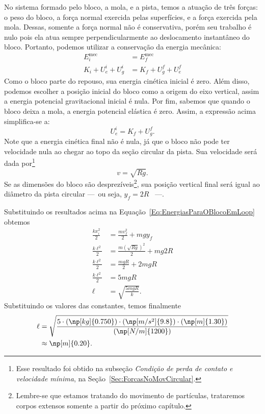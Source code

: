 No sistema formado pelo bloco, a mola, e a pista, temos a atuação de três forças: o peso do bloco, a força normal exercida pelas superfícies, e a força exercida pela mola. Dessas, somente a força normal não é conservativa, porém seu trabalho é nulo pois ela atua sempre perpendicularmente ao deslocamento instantâneo do bloco. Portanto, podemos utilizar a conservação da energia mecânica:
\begin{align}
    E_i^{\textrm{mec}} &= E_f^{\textrm{mec}} \\
    K_i + U_e^i + U_g^i &= K_f + U_g^f + U_e^f
\end{align}
%
Como o bloco parte do repouso, sua energia cinética inicial é zero. Além disso, podemos escolher a posição inicial do bloco como a origem do eixo vertical, assim a energia potencial gravitacional inicial é nula. Por fim, sabemos que quando o bloco deixa a mola, a energia potencial elástica é zero. Assim, a expressão acima simplifica-se a:
\begin{equation}\label{Eq:EnergiasParaOBlocoEmLoop}
    U_e^i = K_f + U_g^f.
\end{equation}
%
Note que a energia cinética final não é nula, já que o bloco não pode ter velocidade nula ao chegar ao topo da seção circular da pista. Sua velocidade será dada por\footnote{Esse resultado foi obtido na subseção \emph{Condição de perda de contato e velocidade mínima}, na Seção~\ref{Sec:ForcasNoMovCircular}.}
\begin{equation}
    v = \sqrt{Rg}.
\end{equation}
%
Se as dimensões do bloco são desprezíveis\footnote{Lembre-se que estamos tratando do movimento de partículas, trataremos corpos extensos somente a partir do próximo capítulo.}, sua posição vertical final será igual ao diâmetro da pista circular ---~ou seja, $y_f = 2R$ ~---.

Substituindo os resultados acima na Equação~\ref{Eq:EnergiasParaOBlocoEmLoop} obtemos
\begin{align}
    \frac{kx_i^2}{2} &= \frac{mv_f^2}{2} + mgy_f \\
    \frac{k\ell^2}{2} &= \frac{m(\sqrt{Rg})^2}{2} + mg2R \\
    \frac{k\ell^2}{2} &= \frac{mgR}{2} + 2mgR \\
    \frac{k\ell^2}{2} &= 5mgR \\
    \ell &= \sqrt{\frac{5mgR}{k}}.
\end{align}
%
Substituindo os valores das constantes, temos finalmente
\begin{align}
    \ell &= \sqrt{\frac{5\cdot(\np[kg]{0.750}) \cdot (\np[m/s^2]{9.8}) \cdot (\np[m]{1.30}) }{(\np[N/m]{1200})}} \\
    &\approx \np[m]{0.20}.
\end{align}



